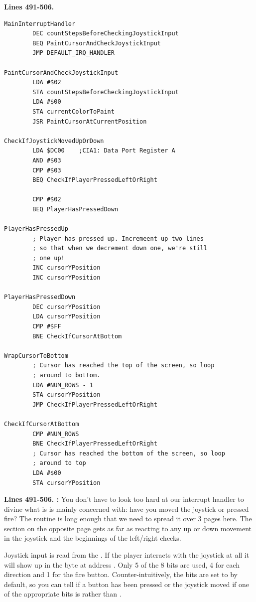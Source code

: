 \clearpage
\textbf{Lines 491-506. }
\begin{lstlisting}[caption= This is our interrupt handler\, it runs 60 times a second so has to be fast.]
MainInterruptHandler   
        DEC countStepsBeforeCheckingJoystickInput
        BEQ PaintCursorAndCheckJoystickInput
        JMP DEFAULT_IRQ_HANDLER

PaintCursorAndCheckJoystickInput   
        LDA #$02
        STA countStepsBeforeCheckingJoystickInput
        LDA #$00
        STA currentColorToPaint
        JSR PaintCursorAtCurrentPosition

CheckIfJoystickMovedUpOrDown   
        LDA $DC00    ;CIA1: Data Port Register A
        AND #$03
        CMP #$03
        BEQ CheckIfPlayerPressedLeftOrRight

        CMP #$02
        BEQ PlayerHasPressedDown

PlayerHasPressedUp
        ; Player has pressed up. Incremeent up two lines
        ; so that when we decrement down one, we're still
        ; one up!
        INC cursorYPosition
        INC cursorYPosition

PlayerHasPressedDown   
        DEC cursorYPosition
        LDA cursorYPosition
        CMP #$FF
        BNE CheckIfCursorAtBottom

WrapCursorToBottom
        ; Cursor has reached the top of the screen, so loop
        ; around to bottom.
        LDA #NUM_ROWS - 1
        STA cursorYPosition
        JMP CheckIfPlayerPressedLeftOrRight

CheckIfCursorAtBottom   
        CMP #NUM_ROWS
        BNE CheckIfPlayerPressedLeftOrRight
        ; Cursor has reached the bottom of the screen, so loop
        ; around to top
        LDA #$00
        STA cursorYPosition

\end{lstlisting}
\clearpage

\textbf{Lines 491-506. :}  You don't have to look too hard at our interrupt handler
to divine what is is mainly concerned with: have you moved the joystick or pressed fire? The routine is long enough
that we need to spread it over 3 pages here. The section on the opposite page gets as far as reacting to any up or
down movement in the joystick and the beginnings of the left/right checks. 

Joystick input is read from the . If the player interacts with the joystick at all it will
show up in the byte at address . Only 5 of the 8 bits are used, 4 for each direction and 1 for the fire button.
Counter-intuitively, the bits are set to  by default, so you can tell if a button has been pressed or the joystick moved
if one of the appropriate bits is  rather than .

